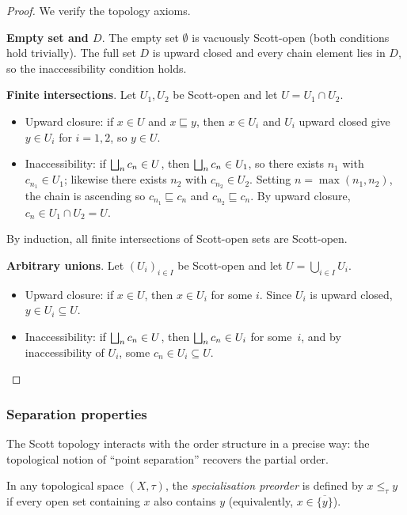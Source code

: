 \begin{proof}
We verify the topology axioms.

\textbf{Empty set and $D$}. The empty set $\emptyset$ is vacuously
Scott-open (both conditions hold trivially). The full set $D$ is upward
closed and every chain element lies in $D$, so the inaccessibility
condition holds.

\textbf{Finite intersections}. Let $U_1, U_2$ be Scott-open and let
$U = U_1 \cap U_2$.
\begin{itemize}
  \item Upward closure: if $x \in U$ and $x \sqsubseteq y$, then
        $x \in U_i$ and $U_i$ upward closed give $y \in U_i$ for
        $i = 1,2$, so $y \in U$.
  \item Inaccessibility: if $\bigsqcup_n c_n \in U$, then
        $\bigsqcup_n c_n \in U_1$, so there exists $n_1$ with
        $c_{n_1} \in U_1$; likewise there exists $n_2$ with
        $c_{n_2} \in U_2$. Setting $n = \max(n_1, n_2)$, the chain is
        ascending so $c_{n_1} \sqsubseteq c_n$ and
        $c_{n_2} \sqsubseteq c_n$. By upward closure,
        $c_n \in U_1 \cap U_2 = U$.
\end{itemize}
By induction, all finite intersections of Scott-open sets are Scott-open.

\textbf{Arbitrary unions}. Let $(U_i)_{i \in I}$ be Scott-open and let
$U = \bigcup_{i \in I} U_i$.
\begin{itemize}
  \item Upward closure: if $x \in U$, then $x \in U_i$ for some $i$.
        Since $U_i$ is upward closed, $y \in U_i \subseteq U$.
  \item Inaccessibility: if $\bigsqcup_n c_n \in U$, then
        $\bigsqcup_n c_n \in U_i$ for some~$i$, and by inaccessibility of
        $U_i$, some $c_n \in U_i \subseteq U$. \qedhere
\end{itemize}
\end{proof}

\subsubsection*{Separation properties}

The Scott topology interacts with the order structure in a precise way:
the topological notion of ``point separation'' recovers the partial
order.

\begin{definition}
\label{def:specialisation}
In any topological space $(X, \tau)$, the \emph{specialisation
preorder} is defined by $x \leq_\tau y$ if every open set containing
$x$ also contains $y$ (equivalently, $x \in \overline{\{y\}}$).
\end{definition}

